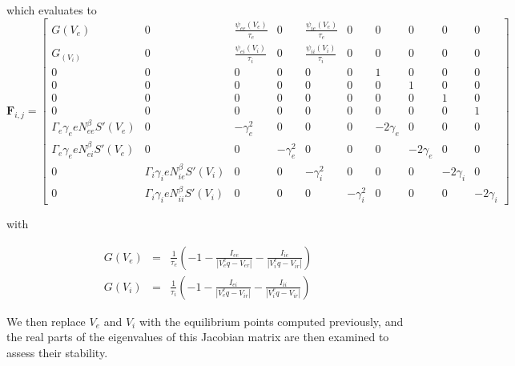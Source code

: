 \documentclass[12pt,twoside]{article}
\begin{document}
which evaluates to 
\[
\mathbf{F}_{i,j} =
\begin{bmatrix}
 G(V_e)  & 
    0 & 
    \frac{\psi_{ee}(V_e)}{\tau_e} &
    0 &
    \frac{\psi_{ie}(V_e)}{\tau_e} &
    0 &
    0 &
    0 &
    0 &
    0 \\[1ex] %
  G_(V_i) & 
    0 & 
    \frac{\psi_{ei}(V_i)}{\tau_i} &
    0 &
    \frac{\psi_{ii}(V_i)}{\tau_i} &
    0 &
    0 &
    0 &
    0 &
    0 \\[1ex]
  0 & 
    0 & 
    0 &
    0 &
    0 &
    0 &
    1 &
    0 &
    0 &
    0\\[1ex]
  0 & 
    0 & 
    0 &
    0 &
    0 &
    0 &
    0 &
    1 &
    0 &
    0\\[1ex]
  0 & 
    0 & 
    0 &
    0 &
    0 &
    0 &
    0 &
    0 &
    1 &
    0\\[1ex]
  0 & 
    0 & 
    0 &
    0 &
    0 &
    0 &
    0 &
    0 &
    0 &
    1\\[1ex]
  \Gamma_e\gamma_{e}eN_{ee}^{\beta}S'(V_e)& 
    0 & 
    -\gamma_{e}^2 &
    0 &
    0 &
    0 &
    -2\gamma_e &
    0 &
    0 &
    0\\[1ex]
  \Gamma_e\gamma_{e}eN_{ei}^{\beta}S'(V_e)& 
    0 & 
    0 &
    -\gamma_{e}^2 &
    0 &
    0 &
    0 &
    -2\gamma_e &
    0 &
    0\\[1ex]
  0 & 
    \Gamma_i\gamma_{i}eN_{ie}^{\beta}S'(V_i) & 
    0 &
    0 &
    -\gamma_{i}^2 &
    0 &
    0 &
    0 &
    -2\gamma_i &
    0\\[1ex]
  0 & 
    \Gamma_i\gamma_{i}eN_{ii}^{\beta}S'(V_i) & 
    0 &
    0 &
    0 &
    -\gamma_{i}^2 &
    0 &
    0 &
    0 &
    -2\gamma_i
\end{bmatrix}
\]

with 

\begin{eqnarray}
    G(V_e) &=&  \frac{1}{\tau_e}(-1 - \frac{I_{ee}}{|V_e^eq - V_{er}|} - \frac{I_{ie}}{|V_i^eq - V_{ir}|}) \\
    G(V_i) &=& \frac{1}{\tau_i}(-1 - \frac{I_{ei}}{|V_e^eq - V_{ir}|} - \frac{I_{ii}}{|V_i^eq - V_{ir}|})
\end{eqnarray}

We then replace $V_e$ and $V_i$ with the equilibrium points computed previously, and the real parts of the eigenvalues of this Jacobian matrix are then examined to assess their stability. 
\end{document}
